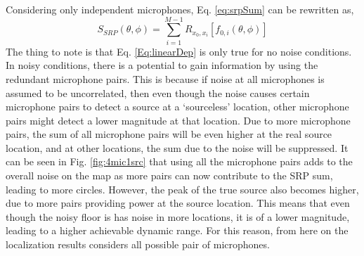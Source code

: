 Considering only independent microphones, Eq. \ref{eq:srpSum} can be rewritten as,
\begin{equation}
    S_{SRP}(\theta,\phi)=\sum\limits_{i=1}^{M-1}{R_{x_0,x_i}[f_{0,i}(\theta,\phi)]}
     \label{eq:srpSumInd}
\end{equation}
The thing to note is that Eq. \ref{Eq:linearDep} is only true for no noise conditions. In noisy conditions, there is a potential to gain information by using the redundant microphone pairs. This is because if noise at all microphones is assumed to be uncorrelated, then even though the noise causes certain microphone pairs to detect a source at a `sourceless' location, other microphone pairs might detect a lower magnitude at that location. Due to more microphone pairs, the sum of all microphone pairs will be even higher at the real source location, and at other locations, the sum due to the noise will be suppressed. It can be seen in Fig. \ref{fig:4mic1src} that using all the microphone pairs adds to the overall noise on the map as more pairs can now contribute to the SRP sum, leading to more circles. However, the peak of the true source also becomes higher, due to more pairs providing power at the source location. This means that even though the noisy floor is has noise in more locations, it is of a lower magnitude, leading to a higher achievable dynamic range. For this reason, from here on the localization results considers all possible pair of microphones.
